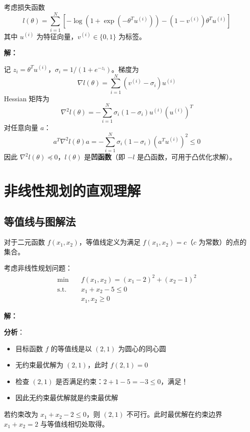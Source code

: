 \begin{example}\label{ex:logistic-hessian}
考虑损失函数
\[
l(\theta) = \sum_{i=1}^N \left[-\log(1 + \exp(-\theta^T u^{(i)})) - (1 - v^{(i)}) \theta^T u^{(i)}\right]
\]
其中 $u^{(i)}$ 为特征向量，$v^{(i)} \in \{0, 1\}$ 为标签。

\textbf{解：}

记 $z_i = \theta^T u^{(i)}$，$\sigma_i = 1/(1 + e^{-z_i})$。梯度为
\[
\nabla l(\theta) = \sum_{i=1}^N (v^{(i)} - \sigma_i) u^{(i)}
\]
Hessian 矩阵为
\[
\nabla^2 l(\theta) = -\sum_{i=1}^N \sigma_i(1 - \sigma_i) u^{(i)} (u^{(i)})^T
\]
对任意向量 $a$：
\[
a^T \nabla^2 l(\theta) a = -\sum_{i=1}^N \sigma_i(1 - \sigma_i) (a^T u^{(i)})^2 \leq 0
\]
因此 $\nabla^2 l(\theta) \preceq 0$，$l(\theta)$ 是\textbf{凹函数}（即 $-l$ 是凸函数，可用于凸优化求解）。
\end{example}

\section{非线性规划的直观理解}\label{sec:intuitive}

\subsection{等值线与图解法}

对于二元函数 $f(x_1, x_2)$，等值线定义为满足 $f(x_1, x_2) = c$（$c$ 为常数）的点的集合。

\begin{example}[图解法]
考虑非线性规划问题：
\[
\begin{aligned}
\min\quad & f(x_1, x_2) = (x_1 - 2)^2 + (x_2 - 1)^2 \\
\text{s.t.}\quad & x_1 + x_2 - 5 \leq 0 \\
& x_1, x_2 \geq 0
\end{aligned}
\]

\textbf{解：}

\textbf{分析}：
\begin{itemize}
    \item 目标函数 $f$ 的等值线是以 $(2, 1)$ 为圆心的同心圆
    \item 无约束最优解为 $(2, 1)$，此时 $f(2,1) = 0$
    \item 检查 $(2, 1)$ 是否满足约束：$2 + 1 - 5 = -3 \leq 0$，满足！
    \item 因此无约束最优解就是约束最优解
\end{itemize}

若约束改为 $x_1 + x_2 - 2 \leq 0$，则 $(2, 1)$ 不可行。此时最优解在约束边界 $x_1 + x_2 = 2$ 与等值线相切处取得。
\end{example}

